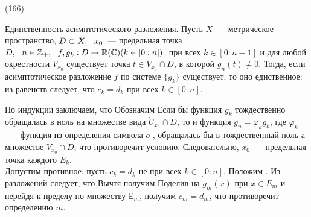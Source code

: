 (166)

\T \q Единственность асимптотического разложения. Пусть $X$~--- метрическое пространство, $D \subset X,\ \  x_0$~--- предельная точка $D,\ \  n \in \mathbb{Z}_+,\ \  f, g_k: D\to \mathbb{R}(\mathbb{C})(k \in [0: n])$, при всех $k \in [0: n - 1]$  и для любой окрестности $V_{x_0}$ существует точка $t \in \dot{V}_{x_0} \cap D$, в которой $g_n(t) \neq 0$. Тогда, если асимптотическое разложение $f$ по системе $\{g_k\}$ существует, то оно едиственное: из равенств 
 следует, что $c_k = d_k$ при всех $k \in [0: n]$.

\D По индукции заключаем, что  Обозначим  Если бы функция $g_k$ тождественно обращалась в ноль на множестве вида $\dot{U}_{x_0} \cap D$, то и функция $g_n = \varphi_k g_k$, где $\varphi_k$~--- функция из определения символа $o$ , обращалась бы в тождественный ноль а множестве $\dot{V}_{x_0} \cap D$, что противоречит условию. Следовательно, $x_0$~--- предельная точка каждого $E_k$.\\
Допустим противное: пусть $c_k = d_k$ не при всех $k \in [0: n]$. Положим .
Из разложений следует, что  Вычтя получим  Поделив на $g_m(x)$ при $x \in E_m$ и перейдя к пределу по множеству $Е_m$, получим $c_m = d_m$, что противоречит определению $m$.